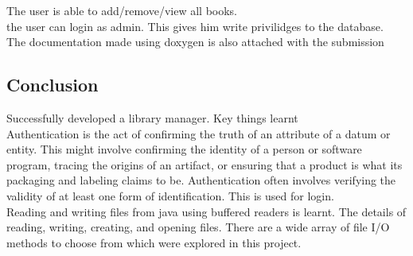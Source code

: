 \documentclass[paper=a4, fontsize=11pt]{scrartcl} %
\numberwithin{equation}{section} %
\numberwithin{figure}{section} %
\numberwithin{table}{section} %
\begin{document}
The user is able to add/remove/view all books.\\
the user can login as admin. This gives him write privilidges to the database.\\

The documentation made using doxygen is also attached with the submission\\


\subsection{Conclusion}
Successfully developed a library manager.
Key things learnt\\
Authentication is the act of confirming the truth of an attribute of a datum or entity. This might involve confirming the identity of a person or software program, tracing the origins of an artifact, or ensuring that a product is what its packaging and labeling claims to be. Authentication often involves verifying the validity of at least one form of identification. This is used for login.\\
Reading and writing files from java using buffered readers is learnt. The details of reading, writing, creating, and opening files. There are a wide array of file I/O methods to choose from which were explored in this  project.\\
\end{document}
